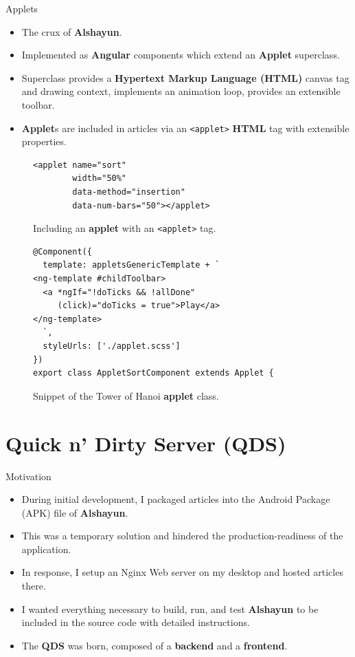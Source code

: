\documentclass{beamer}
\begin{document}
\begin{frame}{Applets}
    \begin{itemize}
        \item The crux of \textbf{Alshayun}.
        \item Implemented as \textbf{Angular} components which extend an
            \textbf{Applet} superclass.
        \item Superclass provides a \textbf{Hypertext Markup Language (HTML)}
            canvas tag and drawing context, implements an animation loop,
            provides an extensible toolbar.
        \item \textbf{Applet}s are included in articles via an \texttt{<applet>}
            \textbf{HTML} tag with extensible properties.
    \end{itemize}
    \begin{figure}
    \begin{verbatim}
<applet name="sort"
        width="50%"
        data-method="insertion"
        data-num-bars="50"></applet>
    \end{verbatim}
        \caption{Including an \textbf{applet} with an \texttt{<applet>} tag.}
    \end{figure}
    \begin{figure}
    \begin{verbatim}
@Component({
  template: appletsGenericTemplate + `
<ng-template #childToolbar>
  <a *ngIf="!doTicks && !allDone"
     (click)="doTicks = true">Play</a>
</ng-template>
  `,
  styleUrls: ['./applet.scss']
})
export class AppletSortComponent extends Applet {
    \end{verbatim}
        \caption{Snippet of the Tower of Hanoi \textbf{applet} class.}
    \end{figure}
\end{frame}

\section{Quick n' Dirty Server (QDS)}

\begin{frame}{Motivation}
    \begin{itemize}
        \item During initial development, I packaged articles into the Android
            Package (APK) file of \textbf{Alshayun}.
        \item This was a temporary solution and hindered the
            production-readiness of the application.
        \item In response, I setup an Nginx Web server on my desktop and hosted
            articles there.
        \item I wanted everything necessary to build, run, and test
            \textbf{Alshayun} to be included in the source code with detailed
            instructions.
        \item The \textbf{QDS} was born, composed of a \textbf{backend} and a
            \textbf{frontend}.
    \end{itemize}
\end{frame}
\end{document}
